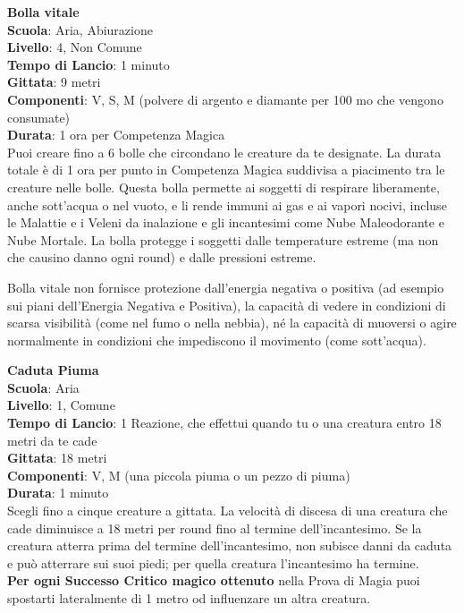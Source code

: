 \begin{multicols}{2}
\medskip\textbf{Bolla vitale}\\
\textbf{Scuola}: Aria, Abiurazione\\
\textbf{Livello}: 4, Non Comune\\
\textbf{Tempo di Lancio}: 1 minuto\\
\textbf{Gittata}: 9 metri\\
\textbf{Componenti}: V, S, M (polvere di argento e diamante per 100 mo che vengono consumate)\\
\textbf{Durata}: 1 ora per Competenza Magica\\
Puoi creare fino a 6 bolle che circondano le creature da te designate.
La durata totale è di 1 ora per punto in Competenza Magica suddivisa a piacimento tra le creature nelle bolle.
Questa bolla permette ai soggetti di respirare liberamente, anche sott’acqua o nel vuoto, e li rende immuni ai gas e ai vapori nocivi, incluse le Malattie e i Veleni da inalazione e gli incantesimi come Nube Maleodorante e Nube Mortale. La bolla protegge i soggetti dalle temperature estreme (ma non che causino danno ogni round) e dalle pressioni estreme.

Bolla vitale non fornisce protezione dall'energia negativa o positiva (ad esempio sui piani dell’Energia Negativa e Positiva), la capacità di vedere in condizioni di scarsa visibilità (come nel fumo o nella nebbia), né la capacità di muoversi o agire normalmente in condizioni che impediscono il movimento (come sott’acqua).

\medskip\textbf{Caduta Piuma}\\
\textbf{Scuola}: Aria\\
\textbf{Livello}: 1, Comune\\
\textbf{Tempo di Lancio}: 1 Reazione, che effettui quando tu o una creatura entro 18 metri da te cade\\
\textbf{Gittata}: 18 metri\\
\textbf{Componenti}: V, M (una piccola piuma o un pezzo di piuma)\\
\textbf{Durata}: 1 minuto\\
Scegli fino a cinque creature a gittata. La velocità di discesa di una creatura che cade diminuisce a 18 metri per round fino al termine dell'incantesimo. Se la creatura atterra prima del termine dell'incantesimo, non subisce danni da caduta e può atterrare sui suoi piedi; per quella creatura l'incantesimo ha termine.\\
\textbf{Per ogni Successo Critico magico ottenuto} nella Prova di Magia puoi spostarti lateralmente di 1 metro od influenzare un altra creatura.


\end{multicols}
